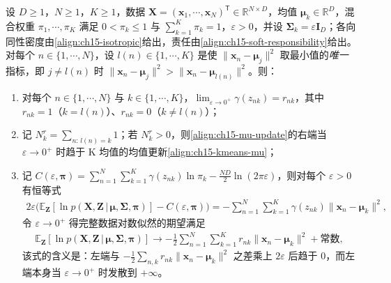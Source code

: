 \documentclass[../../main.tex]{subfiles}
\begin{document}
\begin{proposition}\label{proposition:ch15-EM的K均值极限}
设 $D\geqslant1$，$N\geqslant1$，$K\geqslant1$，数据 $\bm{X}=(\bm{x}_1,\cdots,\bm{x}_N)^{\mathsf T}\in\mathbb{R}^{N\times D}$，均值 $\bm{\mu}_k\in\mathbb{R}^{D}$，混合权重 $\pi_1,\cdots,\pi_K$ 满足 $0<\pi_k\leqslant1$ 与 $\sum_{k=1}^{K}\pi_k=1$，$\varepsilon>0$，并设 $\bm{\Sigma}_k=\varepsilon\bm{I}_D$；各向同性密度由\eqref{align:ch15-isotropic}给出，责任由\eqref{align:ch15-soft-responsibility}给出。对每个 $n\in\{1,\cdots,N\}$，设 $l(n)\in\{1,\cdots,K\}$ 是使 $\|\bm{x}_n-\bm{\mu}_j\|^{2}$ 取最小值的\emph{唯一}指标，即 $j\neq l(n)$ 时 $\|\bm{x}_n-\bm{\mu}_j\|^{2}>\|\bm{x}_n-\bm{\mu}_{l(n)}\|^{2}$。则：
\begin{enumerate}
\item 对每个 $n\in\{1,\cdots,N\}$ 与 $k\in\{1,\cdots,K\}$，$\lim_{\varepsilon\to0^{+}}\gamma(z_{nk})=r_{nk}$，其中 $r_{nk}=1$（$k=l(n)$）、$r_{nk}=0$（$k\neq l(n)$）；
\item 记 $N_k^{r}=\sum_{n:\,l(n)=k}1$；若 $N_k^{r}>0$，则\eqref{align:ch15-mu-update}的右端当 $\varepsilon\to0^{+}$ 时趋于 K 均值的均值更新\eqref{align:ch15-kmeans-mu}；
\item 记 $C(\varepsilon,\bm{\pi})=\sum_{n=1}^{N}\sum_{k=1}^{K}\gamma(z_{nk})\ln\pi_k-\frac{ND}{2}\ln(2\pi\varepsilon)$，则对每个 $\varepsilon>0$ 有恒等式
\begin{align*}
2\varepsilon\Big(\mathbb{E}_{\bm{Z}}\!\left[\ln p(\bm{X},\bm{Z}\,|\,\bm{\mu},\bm{\Sigma},\bm{\pi})\right]-C(\varepsilon,\bm{\pi})\Big)=-\sum_{n=1}^{N}\sum_{k=1}^{K}\gamma(z_{nk})\|\bm{x}_n-\bm{\mu}_k\|^{2},
\end{align*}
令 $\varepsilon\to0^{+}$ 得完整数据对数似然的期望满足
\begin{align}
\mathbb{E}_{\bm{Z}}\!\left[\ln p(\bm{X},\bm{Z}\,|\,\bm{\mu},\bm{\Sigma},\bm{\pi})\right]\longrightarrow-\frac{1}{2}\sum_{n=1}^{N}\sum_{k=1}^{K}r_{nk}\|\bm{x}_n-\bm{\mu}_k\|^{2}+\text{常数},
\label{align:ch15-kmeans-limit}
\end{align}
该式的含义是：左端与 $-\frac{1}{2}\sum_{n,k}r_{nk}\|\bm{x}_n-\bm{\mu}_k\|^{2}$ 之差乘上 $2\varepsilon$ 后趋于 $0$，而左端本身当 $\varepsilon\to0^{+}$ 时发散到 $+\infty$。
\end{enumerate}
\end{proposition}
\end{document}
